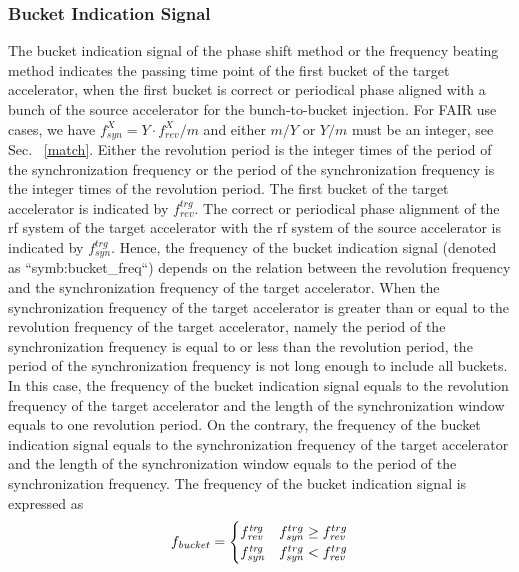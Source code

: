 \subsubsection{Bucket Indication Signal}
The bucket indication signal of the phase shift method or the frequency beating method indicates the passing time point of the first bucket of the target accelerator, when the first bucket is correct or periodical phase aligned with a bunch of the source accelerator for the bunch-to-bucket injection. For FAIR use cases, we have $f_\mathit{syn}^{X}=Y\cdot f_\mathit{rev}^{X}/m$ and either $m/Y$ or $Y/m$ must be an integer, see Sec. ~\ref{match}. Either the revolution period is the integer times of the period of the synchronization frequency or the period of the synchronization frequency is the integer times of the revolution period. The first bucket of the target accelerator is indicated by $f_{\mathit{rev}}^{trg}$. The correct or periodical phase alignment of the rf system of the target accelerator with the rf system of the source accelerator is indicated by $f_{\mathit{syn}}^{trg}$. Hence, the frequency of the bucket indication signal (denoted as ``\gls{symb:bucket_freq}``) depends on the relation between the revolution frequency and the synchronization frequency of the target accelerator. When the synchronization frequency of the target accelerator is greater than or equal to the revolution frequency of the target accelerator, namely the period of the synchronization frequency is equal to or less than the revolution period, the period of the synchronization frequency is not long enough to include all buckets. In this case, the frequency of the bucket indication signal equals to the revolution frequency of the target accelerator and the length of the synchronization window equals to one revolution period. On the contrary, the frequency of the bucket indication signal equals to the synchronization frequency of the target accelerator and the length of the synchronization window equals to the period of the synchronization frequency. The frequency of the bucket indication signal is expressed as
\begin{eqnarray}
\label{bucket_ind}
f_\mathit{bucket}=
\begin{cases}
f_\mathit{rev}^\mathit{trg} &f_{\mathit{syn}}^{trg}\ge f_{\mathit{rev}}^{trg}\cr

f_\mathit{syn}^\mathit{trg}
&f_{\mathit{syn}}^{trg}<f_{\mathit{rev}}^{trg}
\end{cases}
\end{eqnarray}

